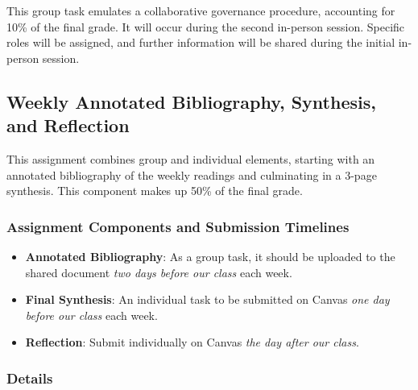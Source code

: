 \documentclass[12pt, letterpaper]{article}
\begin{document}
This group task emulates a collaborative governance procedure, accounting for 10\% of the final grade. It will occur during the second in-person session. Specific roles will be assigned, and further information will be shared during the initial in-person session.  

\subsection{Weekly Annotated Bibliography, Synthesis, and Reflection}

This assignment combines group and individual elements, starting with an annotated bibliography of the weekly readings and culminating in a 3-page synthesis. This component makes up 50\% of the final grade.

\subsubsection{Assignment Components and Submission Timelines}

    \begin{itemize}

    \item \textbf{Annotated Bibliography}: As a group task, it should be uploaded to the shared document \emph{two days before our class} each week.

    \item \textbf{Final Synthesis}: An individual task to be submitted on Canvas \emph{one day before our class} each week.

    \item \textbf{Reflection}: Submit individually on Canvas \emph{the day after our class}.
    
    \end{itemize}

\subsubsection{Details}
\end{document}
